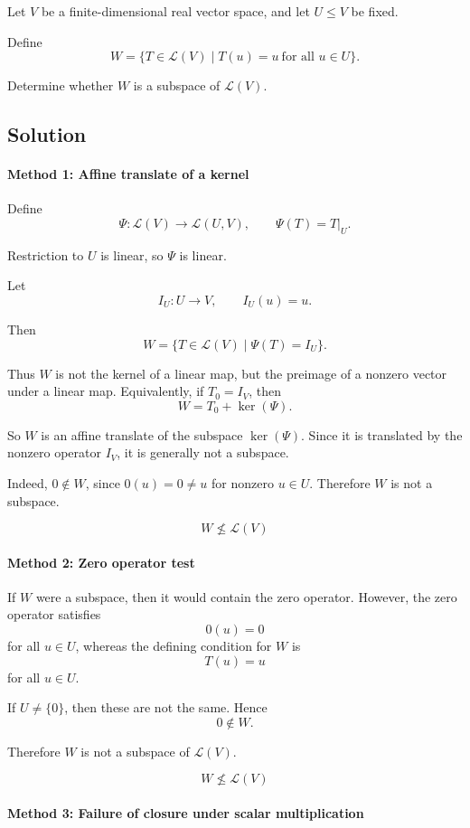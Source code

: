 \documentclass[12pt]{article}
\begin{document}
Let \(V\) be a finite-dimensional real vector space, and let \(U\le V\) be fixed.

Define
\[
W=\{T\in\mathcal L(V)\mid T(u)=u\ \text{for all }u\in U\}.
\]

Determine whether \(W\) is a subspace of \(\mathcal L(V)\).

\subsection{Solution}

\paragraph{Method 1: Affine translate of a kernel}

Define
\[
\Psi:\mathcal L(V)\to\mathcal L(U,V),\qquad
\Psi(T)=T|_U.
\]

Restriction to \(U\) is linear, so \(\Psi\) is linear.

Let
\[
I_U:U\to V,\qquad I_U(u)=u.
\]

Then
\[
W=\{T\in\mathcal L(V)\mid \Psi(T)=I_U\}.
\]

Thus \(W\) is not the kernel of a linear map, but the preimage of a nonzero vector under a linear map. Equivalently, if \(T_0=I_V\), then
\[
W=T_0+\ker(\Psi).
\]

So \(W\) is an affine translate of the subspace \(\ker(\Psi)\). Since it is translated by the nonzero operator \(I_V\), it is generally not a subspace.

Indeed, \(0\notin W\), since \(0(u)=0\neq u\) for nonzero \(u\in U\). Therefore \(W\) is not a subspace.

\[
\boxed{W\not\le \mathcal L(V)}
\]

\paragraph{Method 2: Zero operator test}

If \(W\) were a subspace, then it would contain the zero operator. However, the zero operator satisfies
\[
0(u)=0
\]
for all \(u\in U\), whereas the defining condition for \(W\) is
\[
T(u)=u
\]
for all \(u\in U\).

If \(U\neq\{0\}\), then these are not the same. Hence
\[
0\notin W.
\]

Therefore \(W\) is not a subspace of \(\mathcal L(V)\).

\[
\boxed{W\not\le \mathcal L(V)}
\]

\paragraph{Method 3: Failure of closure under scalar multiplication}
\end{document}
